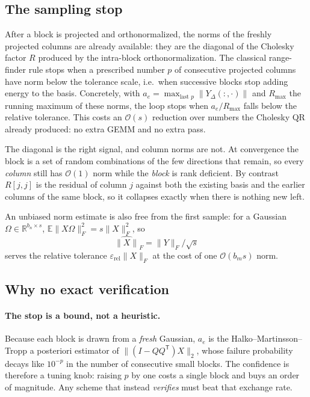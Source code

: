 \documentclass[11pt]{article}
\newcommand{\R}{\mathbb{R}}
\newcommand{\T}{\mathsf{T}}
\begin{document}
\subsection{The sampling stop}
\label{sec:samplestop}

After a block is projected and orthonormalized, the norms of the freshly
projected columns are already available: they are the diagonal of the Cholesky
factor $R$ produced by the intra-block orthonormalization. The classical
range-finder rule stops when a prescribed number $p$ of consecutive projected
columns have norm below the tolerance scale, i.e.\ when successive blocks stop
adding energy to the basis. Concretely, with
$a_e=\max_{\text{last }p}\|Y_\Delta(:,\cdot)\|$ and $R_{\max}$ the running
maximum of these norms, the loop stops when $a_e/R_{\max}$ falls below the
relative tolerance. This costs an $\mathcal O(s)$ reduction over numbers the
Cholesky QR already produced: no extra GEMM and no extra pass.

The diagonal is the right signal, and column norms are not. At convergence the
block is a set of random combinations of the few directions that remain, so
every \emph{column} still has $\mathcal O(1)$ norm while the \emph{block} is
rank deficient. By contrast $R[j,j]$ is the residual of column $j$ against both
the existing basis and the earlier columns of the same block, so it collapses
exactly when there is nothing new left.

An unbiased norm estimate is also free from the first sample: for a Gaussian
$\Omega\in\R^{b_n\times s}$, $\mathbb E\|X\Omega\|_F^2=s\|X\|_F^2$, so
\begin{equation}
\label{eq:normest}
\widehat{\|X\|}_F=\|Y\|_F/\sqrt{s}
\end{equation}
serves the relative tolerance $\varepsilon_{\mathrm{rel}}\|X\|_F$ at the cost of
one $\mathcal O(b_ms)$ norm.

\subsection{Why no exact verification}
\label{sec:noverify}

\paragraph{The stop is a bound, not a heuristic.}
Because each block is drawn from a \emph{fresh} Gaussian, $a_e$ is the
Halko--Martinsson--Tropp a posteriori estimator of
$\|(I-QQ^{\T})X\|_2$, whose failure probability decays like $10^{-p}$ in the
number of consecutive small blocks. The confidence is therefore a tuning knob:
raising $p$ by one costs a single block and buys an order of magnitude. Any
scheme that instead \emph{verifies} must beat that exchange rate.
\end{document}

